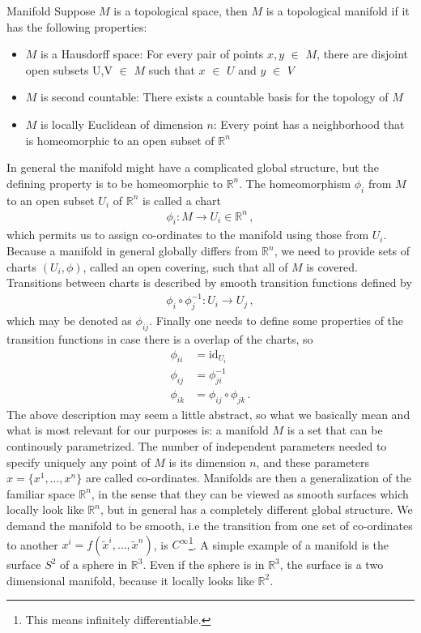 \begin{mydef}{Manifold}{}
Suppose $M$ is a topological space, then $M$ is a topological manifold if it has the following properties:
\begin{itemize}
    \item $M$ is a Hausdorff space: For every pair of points $x,y$ $\in$ $M$, there are disjoint open subsets U,V $\in$ $M$ such that $x$ $\in$ $U$ and $y$ $\in$ $V$
    \item $M$ is second countable: There exists a countable basis for the topology of $M$
    \item $M$ is locally Euclidean of dimension $n$: Every point has a neighborhood that is homeomorphic to an open subset of $\mathbb{R}^{n}$
\end{itemize}
\end{mydef}\noindent
In general the manifold might have a complicated global structure, but the defining property is to be homeomorphic to $\mathbb{R}^{n}$. The homeomorphism $\phi_{i}$ from $M$ to an open subset $U_{i}$ of $\mathbb{R}^{n}$ is called a chart
\begin{align}
    \phi_{i}:M\rightarrow U_{i}\in \mathbb{R}^{n}\,,
\end{align}
which permits us to assign co-ordinates to the manifold using those from $U_{i}$. Because a manifold in general globally differs from $\mathbb{R}^{n}$, we need to provide sets of charts $(U_i,\phi)$, called an open covering, such that all of $M$ is covered. Transitions between charts is described by smooth transition functions defined by
\begin{align}
    \phi_{i}\circ\phi^{-1}_{j}:U_{i}\rightarrow U_{j}\,,
\end{align}
which may be denoted as $\phi_{ij}$. Finally one needs to define some properties of the transition functions in case there is a overlap of the charts, so
\begin{align}
    \phi_{ii}&=\text{id}_{U_{i}}
    \\
    \phi_{ij}&=\phi^{-1}_{ji}
    \\
    \phi_{ik}&=\phi_{ij}\circ\phi_{jk}\,.
\end{align}
The above description may seem a little abstract, so what we basically mean and what is most relevant for our purposes is: a manifold $M$ is a set that can be continously parametrized. The number of independent parameters needed to specify uniquely any point of $M$ is its dimension $n$, and these parameters $x=\{x^{1},\hdots,x^{n}\}$ are called co-ordinates. Manifolds are then a generalization of the familiar space $\mathbb{R}^{n}$, in the sense that they can be viewed as smooth surfaces which locally look like $\mathbb{R}^{n}$, but in general has a completely different global structure. We demand the manifold to be smooth, i.e the transition from one set of co-ordinates to another $x^{i}=f(\tilde{x}^{i},\hdots,\tilde{x}^{n})$, is $C^{\infty}$\footnote{This means infinitely differentiable.}. A simple example of a manifold is the surface $S^{2}$ of a sphere in $\mathbb{R}^{3}$. Even if the sphere is in $\mathbb{R}^{3}$, the surface is a two dimensional manifold, because it locally looks like $\mathbb{R}^{2}$.

